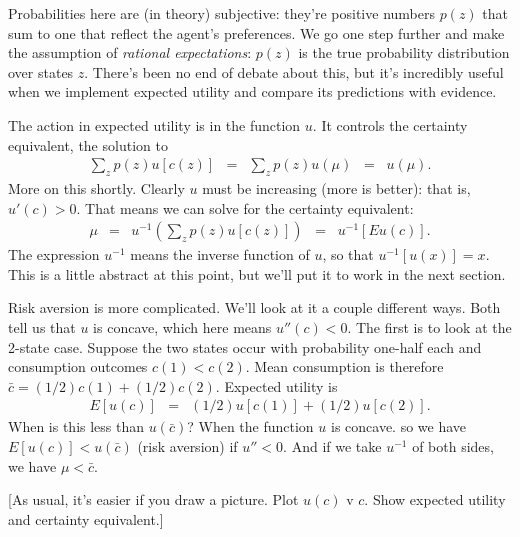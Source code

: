 \documentclass[11pt]{article}
\newcommand{\cbar}{\bar{c}}
\begin{document}
Probabilities here are (in theory) subjective:
they're positive numbers $p(z)$ that sum to one that reflect
the agent's preferences.
We go one step further and make the assumption
of {\it rational expectations\/}:
$p(z)$ is the true probability distribution over states $z$.
There's been no end of debate about this,
but it's incredibly useful when we implement
expected utility and compare its predictions with evidence.


The action in expected utility is in the function $u$.
It controls the certainty equivalent, the solution to
\begin{eqnarray*}
    \sum_z p(z) u[c(z)]
        &=&  \sum_z p(z) u(\mu)  \;\;=\;\; u(\mu) .
\end{eqnarray*}
More on this shortly.
Clearly $u$ must be increasing (more is better):
that is, $u'(c) > 0$.
That means we can solve for the certainty equivalent:
\begin{eqnarray*}
    \mu &=& u^{-1} \left( \sum_z p(z) u[c(z)] \right)
        \;\;=\;\; u^{-1} \left[ E u(c) \right] .
\end{eqnarray*}
The expression $u^{-1}$ means the inverse function of $u$,
so that $u^{-1} [u(x)] = x $.
This is a little abstract at this point, but we'll put it to work
in the next section.


Risk aversion is more complicated.
We'll look at it a couple different ways.
Both tell us that $u$ is concave,
which here means  $u''(c) < 0$.
The first is to look at the 2-state case.
Suppose the two states occur with probability one-half each
and consumption outcomes $c(1) < c(2)$.
Mean consumption is therefore $ \cbar = (1/2)c(1) + (1/2) c(2)$.
Expected utility is
\begin{eqnarray*}
    E [u(c)] &=&  (1/2) u[c(1)] + (1/2) u[c(2)] .
\end{eqnarray*}
When is this less than $u(\cbar)$?
When the function $u$ is concave.
so we have $E[u(c)] < u(\cbar)$ (risk aversion) if $u'' < 0$.
And if we take $u^{-1}$ of both sides, we have
$\mu < \cbar$.

[As usual, it's easier if you draw a picture.
Plot $u(c)$ v $c$.
Show expected utility and certainty equivalent.]
\end{document}
